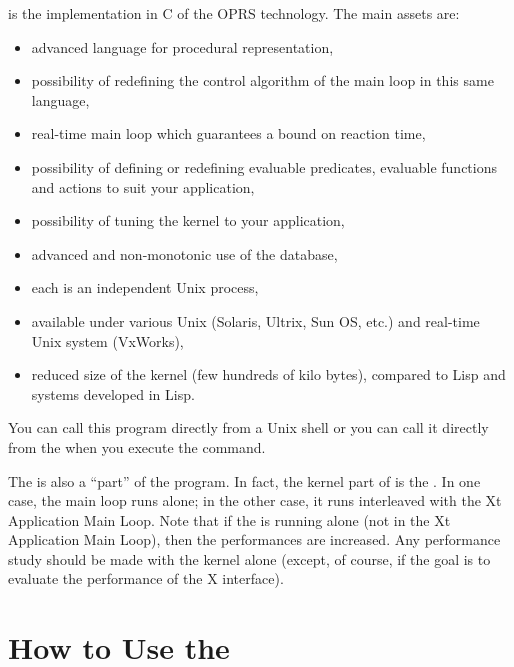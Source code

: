 \COPRS{} is the implementation in C of the OPRS technology. The \COPRS{} main assets
are:

\begin{itemize}

\item advanced language for procedural representation,

\item possibility of redefining the control algorithm of the main loop in
this same language,

\item real-time main loop which guarantees a bound on reaction time,

\item possibility of defining or redefining evaluable predicates,
evaluable functions and actions to suit your application,

\item possibility of tuning the kernel to your application,

\item advanced and non-monotonic use of the database,

\item each \CPK{} is an independent Unix process,

\item available under various Unix (Solaris, Ultrix, Sun OS, etc.) and real-time
Unix system (VxWorks),

\item reduced size of the kernel (few hundreds of kilo bytes), compared
to Lisp and systems developed in Lisp.

\end{itemize}

You can call this program directly from a Unix shell or you can call it
directly from the \OPRSS{} when you execute the  command.

The \CPK{} is also a ``part'' of the \XOPRS{} program. In fact, the
kernel part of \XOPRS{} is the \CPK{}. In one case, the main loop
runs alone; in the other case, it runs interleaved with the Xt
Application Main Loop. Note that if the \CPK{} is running alone (not in
the Xt Application Main Loop), then the performances are increased. Any
performance study should be made with the kernel alone (except, of course,
if the goal is to evaluate the performance of the X interface).

\chapter{How to Use the \CPK{}}

